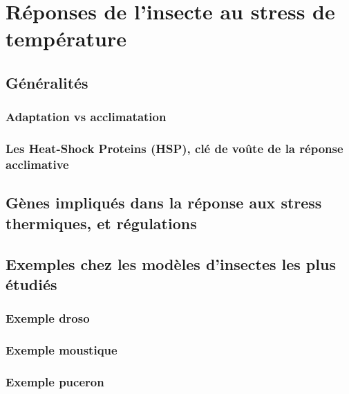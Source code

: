 \chapter{Réponses de l'insecte au stress de température} %
\label{chap:repstress}
	
	\section{Généralités} %
	\label{sec:g_n_ralit_s}
		

		\subsection{Adaptation vs acclimatation} %
		\label{sub:adaptation_vs_accilmatation}
			

%			

		\subsection{Les Heat-Shock Proteins (HSP), clé de voûte de la réponse acclimative} %
		\label{sub:generalites_HSP}
			

	\section{Gènes impliqués dans la réponse aux stress thermiques, et régulations} %
	\label{sec:genes}
		

	\section{Exemples chez les modèles d'insectes les plus étudiés} %
	\label{sec:exemples_modeles}
		

		\subsection{Exemple droso} %
		\label{sub:exemple_droso}
			

		\subsection{Exemple moustique} %
		\label{sub:exemple_moustique}
			

		\subsection{Exemple puceron} %
		\label{sub:exemple_puceron}
			

